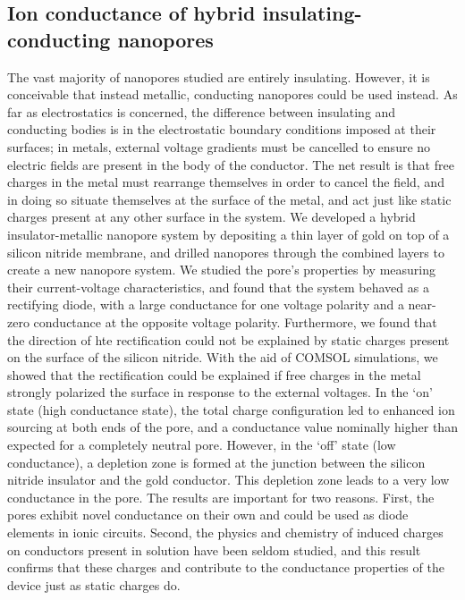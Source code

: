 	\subsection{Ion conductance of hybrid insulating-conducting nanopores}
		
		The vast majority of nanopores studied are entirely insulating. However, it is conceivable that instead metallic, conducting nanopores could be used instead. As far as electrostatics is concerned, the difference between insulating and conducting bodies is in the electrostatic boundary conditions imposed at their surfaces; in metals, external voltage gradients must be cancelled to ensure no electric fields are present in the body of the conductor. The net result is that free charges in the metal must rearrange themselves in order to cancel the field, and in doing so situate themselves at the surface of the metal, and act just like static charges present at any other surface in the system. We developed a hybrid insulator-metallic nanopore system by depositing a thin layer of gold on top of a silicon nitride membrane, and drilled nanopores through the combined layers to create a new nanopore system. We studied the pore's properties by measuring their current-voltage characteristics, and found that the system behaved as a rectifying diode, with a large conductance for one voltage polarity and a near-zero conductance at the opposite voltage polarity. Furthermore, we found that the direction of hte rectification could not be explained by static charges present on the surface of the silicon nitride. With the aid of COMSOL simulations, we showed that the rectification could be explained if free charges in the metal strongly polarized the surface in response to the external voltages. In the `on' state (high conductance state), the total charge configuration led to enhanced ion sourcing at both ends of the pore, and a conductance value nominally higher than expected for a completely neutral pore. However, in the `off' state (low conductance), a depletion zone is formed at the junction between the silicon nitride insulator and the gold conductor. This depletion zone leads to a very low conductance in the pore. The results are important for two reasons. First, the pores exhibit novel conductance on their own and could be used as diode elements in ionic circuits. Second, the physics and chemistry of induced charges on conductors present in solution have been seldom studied, and this result confirms that these charges and contribute to the conductance properties of the device just as static charges do.
		
